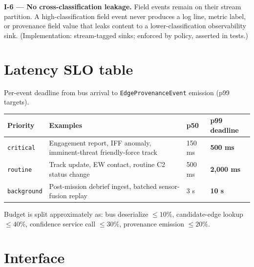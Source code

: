 \begin{invariant}
\textbf{I-6 --- No cross-classification leakage.} Field events remain on their stream partition. A high-classification field event never produces a log line, metric label, or provenance field value that leaks content to a lower-classification observability sink. (Implementation: stream-tagged sinks; enforced by policy, asserted in tests.)
\end{invariant}

\section{Latency SLO table}

Per-event deadline from bus arrival to \texttt{EdgeProvenanceEvent} emission (p99 targets).

\begin{center}
\begin{tabular}{@{}llll@{}}
\toprule
\textbf{Priority} & \textbf{Examples} & \textbf{p50} & \textbf{p99 deadline} \\
\midrule
\texttt{critical}   & Engagement report, IFF anomaly, imminent-threat friendly-force track & 150 ms & \textbf{500 ms} \\
\texttt{routine}    & Track update, EW contact, routine C2 status change                  & 500 ms & \textbf{2{,}000 ms} \\
\texttt{background} & Post-mission debrief ingest, batched sensor-fusion replay           & 3 s    & \textbf{10 s} \\
\bottomrule
\end{tabular}
\end{center}

Budget is split approximately as: bus deserialize $\leq 10\%$, candidate-edge lookup $\leq 40\%$, confidence service call $\leq 30\%$, provenance emission $\leq 20\%$.

\section{Interface}

